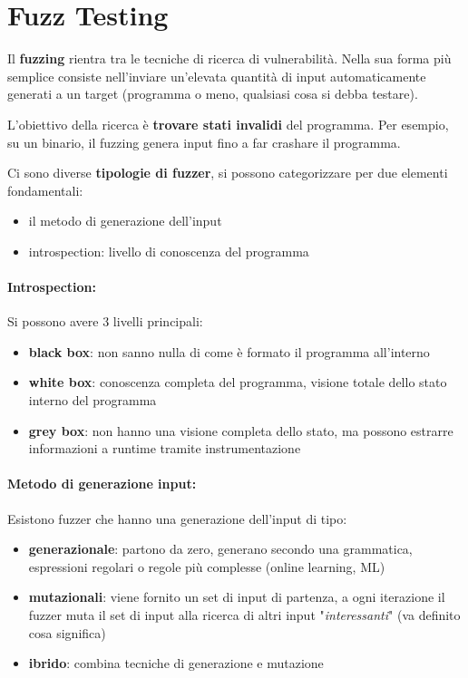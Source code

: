\section{Fuzz Testing}

Il \textbf{fuzzing} rientra tra le tecniche di ricerca di vulnerabilità. Nella sua forma più semplice consiste nell'inviare un'elevata quantità di input automaticamente generati a un target (programma o meno, qualsiasi cosa si debba testare). 

L'obiettivo della ricerca è \textbf{trovare stati invalidi} del programma. Per esempio, su un binario, il fuzzing genera input fino a far crashare il programma.

Ci sono diverse \textbf{tipologie di fuzzer}, si possono categorizzare per due elementi fondamentali: 
\begin{itemize}
	\item il metodo di generazione dell'input
    
	\item introspection: livello di conoscenza del programma
\end{itemize}

\paragraph{Introspection:} Si possono avere 3 livelli principali: 
\begin{itemize}
	\item \textbf{black box}: non sanno nulla di come è formato il programma all'interno
	
    \item \textbf{white box}: conoscenza completa del programma, visione totale dello stato interno del programma
	
    \item \textbf{grey box}: non hanno una visione completa dello stato, ma possono estrarre informazioni a runtime tramite instrumentazione
\end{itemize}

\paragraph{Metodo di generazione input:} Esistono fuzzer che hanno una generazione dell'input di tipo: 
\begin{itemize}
	\item \textbf{generazionale}: partono da zero, generano secondo una grammatica, espressioni regolari o regole più complesse (online learning, ML)
	
    \item \textbf{mutazionali}: viene fornito un set di input di partenza, a ogni iterazione il fuzzer muta il set di input alla ricerca di altri input "\textit{interessanti}" (va definito cosa significa)
	
    \item \textbf{ibrido}: combina tecniche di generazione e mutazione
\end{itemize}


